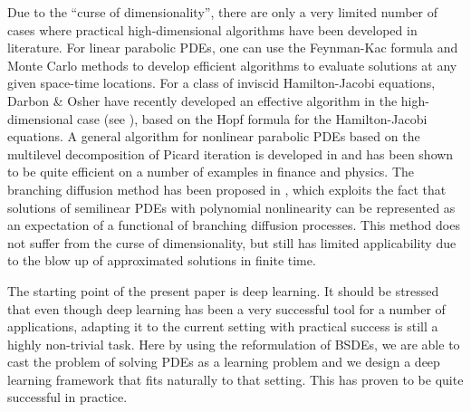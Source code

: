 \documentclass[11pt,english]{article}
\begin{document}
Due to the  ``curse of dimensionality'', there are only a very limited number of cases where practical high-dimensional algorithms have been developed in literature.
For linear parabolic PDEs, one can use the Feynman-Kac formula and Monte Carlo methods to develop efficient algorithms
to evaluate solutions at any given space-time locations.  
For a class of inviscid Hamilton-Jacobi equations, 
Darbon \& Osher have recently developed an effective algorithm 
in the high-dimensional case (see \cite{Darbon2016}), based on the Hopf formula for the Hamilton-Jacobi equations.
A general algorithm for nonlinear parabolic PDEs
based on the multilevel decomposition of
Picard iteration is developed in \cite{Weinan2016} and has been 
shown to be quite efficient on a number of examples in finance and physics.
The branching diffusion method has been proposed in \cite{Henry-Labordere2012,Henry-Labordere2014}, which exploits  the fact that  solutions of semilinear PDEs with polynomial nonlinearity can be represented as an expectation of a functional of  branching diffusion processes. This method does not suffer from the curse of dimensionality, but still has limited applicability  due to the blow up of approximated solutions in finite time.

The starting point of the present paper is deep learning.  It should be stressed that even though  deep learning has been a very successful tool for a number  of applications, adapting it to the current setting with practical success is still a highly non-trivial task.  Here by using the reformulation of BSDEs, we are able to cast the problem of solving PDEs as a learning problem and we design a deep learning framework that fits naturally to that setting. This has proven to be quite successful in practice. 

\end{document}
